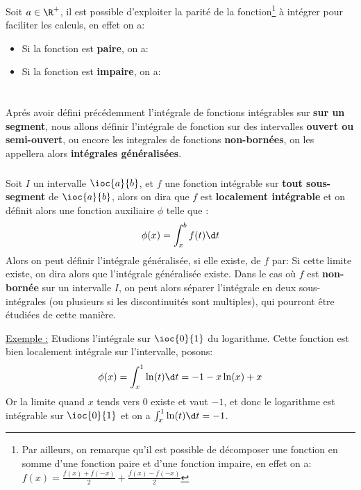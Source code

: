 Soit \(a \in \R^+\), il est possible d'exploiter la parité de la fonction\footnote[3]{Par ailleurs, on remarque qu'il est possible de décomposer une fonction en somme d'une fonction paire et d'une fonction impaire, en effet on a:
\(f(x) = \frac{f(x) + f(-x)}{2} + \frac{f(x) - f(-x)}{2}\)} à intégrer pour faciliter les calculs, en effet on a:
\begin{itemize}
   \item Si la fonction est \textbf{paire}, on a:
   \item Si la fonction est \textbf{impaire}, on a:
\end{itemize}




\chapter*{}
Aprés avoir défini précédemment l'intégrale de fonctions intégrables sur \textbf{sur un segment}, nous allons définir l'intégrale de fonction sur des intervalles \textbf{ouvert ou semi-ouvert}, ou encore les integrales de fonctions \textbf{non-bornées}, on les appellera alors \textbf{intégrales généralisées}.
\subsection*{}
Soit \(I\) un intervalle \(\ioc{a}{b}\), et \(f\) une fonction intégrable sur \textbf{tout sous-segment} de \(\ioc{a}{b}\), alors on dira que \(f\) est \textbf{localement intégrable} et on définit alors une fonction auxiliaire \(\phi\) telle que :
\[
   \phi(x) = \int_{x}^{b} f(t) \d t
\]
Alors on peut définir l'intégrale généralisée, si elle existe, de \(f\) par:
Si cette limite existe, on dira alors que l'intégrale généralisée existe.\+ 
Dans le cas où \(f\) est \textbf{non-bornée} sur un intervalle \(I\), on peut alors séparer l'intégrale en deux sous-intégrales (ou plusieurs si les discontinuités sont multiples), qui pourront être étudiées de cette manière.\<

\underline{Exemple :} Etudions l'intégrale sur \(\ioc{0}{1}\) du logarithme. Cette fonction est bien localement intégrale sur l'intervalle, posons:
\[
   \phi(x) = \int_{x}^{1} \ln(t) \d t = - 1 - x\ln(x) + x 
\]
Or la limite quand \(x\) tends vers \(0\) existe et vaut \(-1\), et donc le logarithme est intégrable sur \(\ioc{0}{1}\) et on a \(\int_{x}^{1} \ln(t) \d t = -1\).
